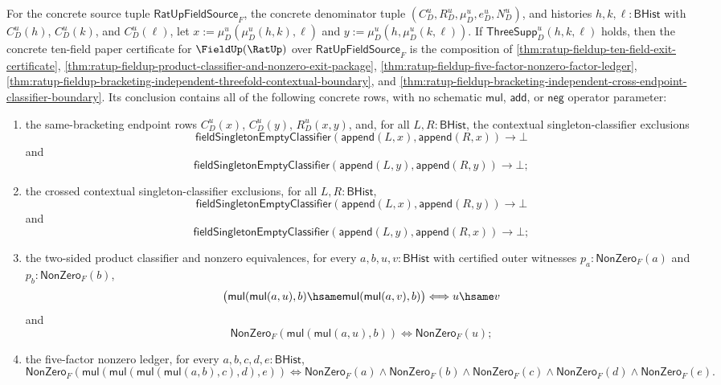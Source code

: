 \begin{theorem}
\label{thm:ratup-fieldup-crossed-ten-field-exit-certificate}
For the concrete source tuple $\mathsf{RatUpFieldSource}_F$, the concrete
denominator tuple $(C_D^u,R_D^u,\mu_D^u,e_D^u,N_D^u)$, and histories
$h,k,\ell:\mathsf{BHist}$ with $C_D^u(h)$, $C_D^u(k)$, and $C_D^u(\ell)$, let
$x:=\mu_D^u(\mu_D^u(h,k),\ell)$ and
$y:=\mu_D^u(h,\mu_D^u(k,\ell))$. If
$\mathsf{ThreeSupp}_D^u(h,k,\ell)$ holds, then the concrete ten-field paper
certificate for $\FieldUp(\RatUp)$ over $\mathsf{RatUpFieldSource}_F$ is the
composition of
\autoref{thm:ratup-fieldup-ten-field-exit-certificate},
\autoref{thm:ratup-fieldup-product-classifier-and-nonzero-exit-package},
\autoref{thm:ratup-fieldup-five-factor-nonzero-factor-ledger},
\autoref{thm:ratup-fieldup-bracketing-independent-threefold-contextual-boundary},
and
\autoref{thm:ratup-fieldup-bracketing-independent-cross-endpoint-classifier-boundary}.
Its conclusion contains all of the following concrete rows, with no schematic
$\mathsf{mul}$, $\mathsf{add}$, or $\mathsf{neg}$ operator parameter:
\begin{enumerate}
  \item the same-bracketing endpoint rows $C_D^u(x)$, $C_D^u(y)$,
  $R_D^u(x,y)$, and, for all $L,R:\mathsf{BHist}$, the contextual
  singleton-classifier exclusions
  $$
  \mathsf{fieldSingletonEmptyClassifier}(\mathsf{append}(L,x),\mathsf{append}(R,x))
  \to\bot
  $$
  and
  $$
  \mathsf{fieldSingletonEmptyClassifier}(\mathsf{append}(L,y),\mathsf{append}(R,y))
  \to\bot;
  $$
  \item the crossed contextual singleton-classifier exclusions, for all
  $L,R:\mathsf{BHist}$,
  $$
  \mathsf{fieldSingletonEmptyClassifier}(\mathsf{append}(L,x),\mathsf{append}(R,y))
  \to\bot
  $$
  and
  $$
  \mathsf{fieldSingletonEmptyClassifier}(\mathsf{append}(L,y),\mathsf{append}(R,x))
  \to\bot;
  $$
  \item the two-sided product classifier and nonzero equivalences, for every
  $a,b,u,v:\mathsf{BHist}$ with certified outer witnesses
  $p_a:\mathsf{NonZero}_F(a)$ and $p_b:\mathsf{NonZero}_F(b)$,
  $$
  \bigl(\mathsf{mul}(\mathsf{mul}(a,u),b)
  \hsame
  \mathsf{mul}(\mathsf{mul}(a,v),b)\bigr)
  \Longleftrightarrow
  u\hsame v
  $$
  and
  $$
  \mathsf{NonZero}_F(\mathsf{mul}(\mathsf{mul}(a,u),b))
  \Longleftrightarrow
  \mathsf{NonZero}_F(u);
  $$
  \item the five-factor nonzero ledger, for every
  $a,b,c,d,e:\mathsf{BHist}$,
  $$
  \mathsf{NonZero}_F(
  \mathsf{mul}(\mathsf{mul}(\mathsf{mul}(\mathsf{mul}(a,b),c),d),e))
  \Longleftrightarrow
  \mathsf{NonZero}_F(a)\wedge\mathsf{NonZero}_F(b)\wedge
  \mathsf{NonZero}_F(c)\wedge\mathsf{NonZero}_F(d)\wedge
  \mathsf{NonZero}_F(e).
  $$
\end{enumerate}
\end{theorem}
